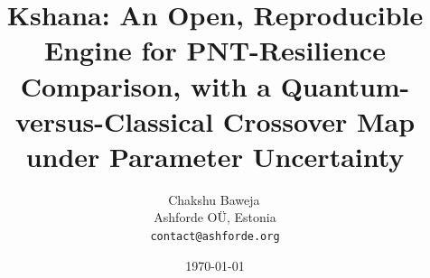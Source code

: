 \documentclass[11pt]{article}
\title{\textbf{Kshana: An Open, Reproducible Engine for PNT-Resilience
Comparison, with a Quantum-versus-Classical Crossover Map under Parameter
Uncertainty}}
\author{Chakshu Baweja\,\orcidlink{0009-0008-2098-0751}\\
\small Ashforde O\"U, Estonia \\
\small \texttt{contact@ashforde.org}}
\date{\today}
\begin{document}
\maketitle

\begin{abstract}

\end{abstract}














\appendix

\end{document}
